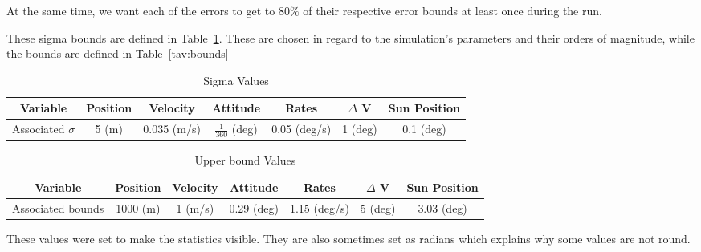 At the same time, we want each of the errors to get to $80\%$ of their respective error bounds
at least once during the run.

These sigma bounds are defined in Table~\ref{tab:sigmas}. These are chosen in regard to
the simulation's parameters and their orders of magnitude, while the bounds are defined in
Table~\ref{tav:bounds}

\begin{table}[htbp]
    \caption{Sigma Values}
\label{tab:sigmas}
    \centering \fontsize{10}{10}\selectfont
\begin{tabular}{|c||c|c|c|c|c|c|}
\hline
Variable & Position & Velocity & Attitude & Rates & $\Delta$ V & Sun Position \\ \hline \hline
Associated $\sigma$ & 5 (m)& 0.035 (m/s)& $\frac{1}{360}$ (deg) & 0.05 (deg/s) & 1 (deg) & 0.1 (deg) \\ \hline 
\end{tabular}
\end{table}

\begin{table}[htbp]
    \caption{Upper bound Values}
\label{tab:bounds}
    \centering \fontsize{10}{10}\selectfont
\begin{tabular}{|c||c|c|c|c|c|c|}
\hline
Variable & Position & Velocity & Attitude & Rates & $\Delta$ V & Sun Position \\ \hline \hline
Associated bounds & 1000 (m)& 1 (m/s)& 0.29 (deg) & 1.15 (deg/s) & 5 (deg) & 3.03 (deg) \\ \hline 
\end{tabular}
\end{table}

These values were set to make the statistics visible. They are also sometimes set as radians which explains why some values are not round.

